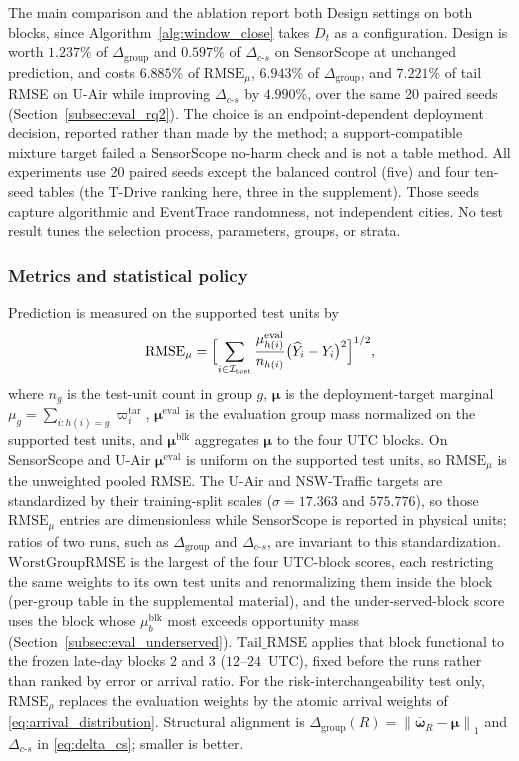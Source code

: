 \documentclass[letterpaper,journal]{IEEEtran}
\begin{document}
The main comparison and the ablation report both Design settings on both blocks,
since Algorithm~\ref{alg:window_close} takes $D_t$ as a configuration.  Design is
worth $1.237\%$ of
$\Delta_{\mathrm{group}}$ and $0.597\%$ of $\Delta_{c\text{-}s}$ on SensorScope at
unchanged prediction, and costs $6.885\%$ of $\mathrm{RMSE}_{\mu}$, $6.943\%$ of
$\Delta_{\mathrm{group}}$, and $7.221\%$ of tail RMSE on U-Air while improving
$\Delta_{c\text{-}s}$ by $4.990\%$, over the same 20 paired seeds
(Section~\ref{subsec:eval_rq2}).  The choice is an endpoint-dependent deployment
decision, reported rather than made by the method; a support-compatible mixture
target failed a SensorScope no-harm check and is not a table method.
All experiments use 20 paired seeds except the balanced control (five) and four ten-seed tables (the T-Drive
ranking here, three in the supplement).  Those seeds capture algorithmic and EventTrace randomness, not independent
cities.  No test result tunes the selection process, parameters, groups, or strata.

\subsubsection{Metrics and statistical policy}

Prediction is measured on the supported test units by
\[
 \mathrm{RMSE}_{\mu}
 =
 \Bigl[\sum_{i\in\mathcal{I}_{\mathrm{test}}}
 \frac{\mu^{\mathrm{eval}}_{h(i)}}{n_{h(i)}}
 \bigl(\widehat Y_i-Y_i\bigr)^2\Bigr]^{1/2},
\]
where $n_g$ is the test-unit count in group $g$, $\boldsymbol\mu$ is the
deployment-target marginal $\mu_g=\sum_{i:h(i)=g}\varpi_i^{\mathrm{tar}}$,
$\boldsymbol\mu^{\mathrm{eval}}$ is the evaluation group mass normalized on
the supported test units, and $\boldsymbol\mu^{\mathrm{blk}}$ aggregates
$\boldsymbol\mu$ to the four UTC blocks.  On SensorScope and U-Air
$\boldsymbol\mu^{\mathrm{eval}}$ is uniform on the supported test units, so
$\mathrm{RMSE}_{\mu}$ is the unweighted pooled RMSE.
The U-Air and NSW-Traffic targets are standardized by their training-split
scales ($\sigma=17.363$ and $575.776$), so those $\mathrm{RMSE}_{\mu}$ entries
are dimensionless while SensorScope is reported in physical units; ratios of two
runs, such as $\Delta_{\mathrm{group}}$ and $\Delta_{c\text{-}s}$, are invariant
to this standardization.  $\mathrm{WorstGroupRMSE}$ is the largest of the four
UTC-block scores, each restricting the same weights to its own test units and
renormalizing them inside the block (per-group table in the supplemental
material), and the under-served-block score uses the block whose
$\mu^{\mathrm{blk}}_b$ most exceeds opportunity mass
(Section~\ref{subsec:eval_underserved}).  $\mathrm{Tail\_RMSE}$ applies that
block functional to the frozen late-day blocks $2$ and $3$ ($12$--$24$~UTC),
fixed before the runs rather than ranked by error or arrival ratio.  For the
risk-interchangeability test only, $\mathrm{RMSE}_{\rho}$ replaces the evaluation
weights by the atomic arrival weights of \eqref{eq:arrival_distribution}.
Structural alignment is
$\Delta_{\mathrm{group}}(R)=\left\|\overline{\boldsymbol\omega}_R-\boldsymbol\mu\right\|_1$
and $\Delta_{c\text{-}s}$ in \eqref{eq:delta_cs}; smaller is better.
\end{document}
